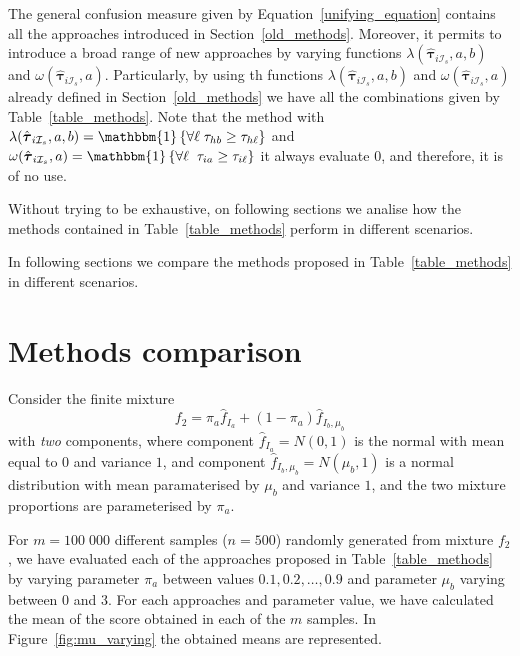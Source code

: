 \documentclass[10pt, a4paper]{article}
\newcommand{\m}[1]{\boldsymbol{#1}}
\begin{document}
The general confusion measure given by Equation~\ref{unifying_equation} contains all the approaches introduced in Section~\ref{old_methods}. Moreover, it permits to introduce a broad range of new approaches by varying functions $\lambda(\hat{\m \tau}_{i \mathcal{I}_s}, a, b)$ and $\omega(\hat{\m \tau}_{i \mathcal{I}_s}, a)$. Particularly, by using th functions $\lambda(\hat{\m \tau}_{i \mathcal{I}_s}, a, b)$ and $\omega(\hat{\m \tau}_{i \mathcal{I}_s}, a)$ already defined in Section~\ref{old_methods} we have all the combinations given by Table~\ref{table_methods}. Note that the method with $\lambda(\hat{\m \tau}_{i \mathcal{I}_s}, a, b) =  \mathlarger{\mathbbm{1}}\left\{  \forall \ell \; \tau_{hb} \geq \tau_{h\ell}  \right\}$ and  $\omega(\hat{\m \tau}_{i \mathcal{I}_s}, a) = \mathlarger{\mathbbm{1}}\left\{  \forall \ell\; \; \tau_{ia} \geq \tau_{i\ell}  \right\}$ it always evaluate 0, and therefore, it is of no use.

Without trying to be exhaustive, on following sections we analise how the methods contained in Table~\ref{table_methods} perform in different scenarios.

In following sections we compare the methods proposed in Table~\ref{table_methods} in different scenarios.

\section{Methods comparison}


Consider the finite mixture
\begin{equation}\label{two_mixture}
f_2 = \pi_a \hat{f}_{I_a} + (1 - \pi_a) \hat{f}_{I_b, \mu_b}
\end{equation}
with \emph{two} components, where component $\hat{f}_{I_a} = N(0, 1)$ is  the normal with mean equal to $0$ and variance $1$, and component $\hat{f}_{I_b, \mu_b} = N(\mu_b, 1)$ is a normal distribution with mean paramaterised by $\mu_b$ and variance $1$, and the two mixture proportions are parameterised by $\pi_a$.

For $m=100\;000$ different samples ($n=500$) randomly generated from mixture $f_2$, we have evaluated each of the approaches proposed in Table~\ref{table_methods} by varying parameter $\pi_a$ between values $0.1, 0.2, \dots, 0.9$ and parameter $\mu_b$ varying between $0$ and $3$. For each approaches and parameter value, we have calculated the mean of the score obtained in each of the $m$ samples. In Figure~\ref{fig:mu_varying} the obtained means are represented.
\end{document}
